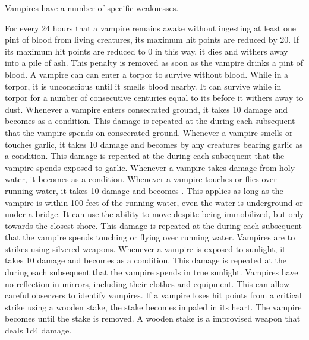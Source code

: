   Vampires have a number of specific weaknesses.
  \begin{itemize}
     For every 24 hours that a vampire remains awake without ingesting at least one pint of blood from living creatures, its maximum hit points are reduced by 20.
      If its maximum hit points are reduced to 0 in this way, it dies and withers away into a pile of ash.
      This penalty is removed as soon as the vampire drinks a pint of blood.
      A vampire can can enter a torpor to survive without blood.
      While in a torpor, it is unconscious until it smells blood nearby.
      It can survive while in torpor for a number of consecutive centuries equal to its  before it withers away to dust.
     Whenever a vampire enters consecrated ground, it takes 10 damage and becomes \stunned as a condition.
      This damage is repeated at the during each subsequent  that the vampire spends on consecrated ground.
     Whenever a vampire smells or touches garlic, it takes 10 damage and becomes \frightened by any creatures bearing garlic as a condition.
      This damage is repeated at the during each subsequent  that the vampire spends exposed to garlic.
     Whenever a vampire takes damage from holy water, it becomes \stunned as a condition.
     Whenever a vampire touches or flies over running water, it takes 10 damage and  becomes \immobilized.
      This applies as long as the vampire is within 100 feet of the running water, even the water is underground or under a bridge.
      It can use the  ability to move despite being immobilized, but only towards the closest shore.
      This damage is repeated at the during each subsequent  that the vampire spends touching or flying over running water.
     Vampires are \vulnerable to strikes using silvered weapons.
     Whenever a vampire is exposed to sunlight, it takes 10 damage and becomes \stunned as a condition.
      This damage is repeated at the during each subsequent  that the vampire spends in true sunlight.
     Vampires have no reflection in mirrors, including their clothes and equipment.
      This can allow careful observers to identify vampires.
     If a vampire loses hit points from a critical strike using a wooden stake, the stake becomes impaled in its heart.
      The vampire becomes \paralyzed until the stake is removed.
      A wooden stake is a  improvised weapon that deals 1d4 damage.
  \end{itemize}

